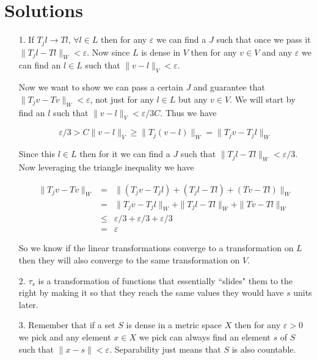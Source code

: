 \documentclass[oneside]{book}
\begin{document}
\section*{Solutions}
\begin{enumerate}
\item[1.] If $T_j l \to T l,\, \forall l \in L$ then for any $\varepsilon$ we can find a $J$ such that once we pass it $\|T_jl - Tl\|_W < \varepsilon$. Now since $L$ is dense in $V$ then for any $v \in V$ and any $\varepsilon$ we can find an $l \in L$ such that $\|v-l\|_V < \varepsilon$.

Now we want to show we can pass a certain $J$ and guarantee that $\|T_jv-Tv\|_W < \varepsilon$, not just for any $l \in L$ but any $v \in V$. We will start by find an $l$ such that $\|v-l \|_V < \varepsilon/3C$. Thus we have

\begin{equation}
\varepsilon/3 > C \|v-l\|_V \ge \|T_j(v-l) \|_W = \|T_jv - T_j l\|_W
\end{equation} 

Since this $l \in L$ then for it we can find a $J$ such that $\|T_jl - Tl\|_W < \varepsilon/3$. Now leveraging the triangle inequality we have

\begin{eqnarray}
\|T_j v - Tv \|_W &=& \| (T_jv-T_jl) + (T_jl-Tl) + (Tv-Tl) \|_W \nonumber \\
&=& \|T_jv-T_jl\|_W + \|T_jl-Tl\|_W + \|Tv-Tl\|_W \nonumber \\
&\le& \varepsilon/3 + \varepsilon/3 + \varepsilon/3 \nonumber \\
&=& \varepsilon
\end{eqnarray}

So we know if the linear transformations converge to a transformation on $L$ then they will also converge to the same transformation on $V$.

\item[2.] $\tau_s$ is a transformation of functions that essentially ``slides" them to the right by making it so that they reach the same values they would have $s$ units later.

\item[3.] Remember that if a set $S$ is dense in a metric space $X$ then for any $\varepsilon >0$ we pick and any element $x\in X$ we pick can always find an element $s$ of $S$ such that $\|x-s\| < \varepsilon$. Separability just means that $S$ is also countable.


\end{enumerate}
\end{document}
